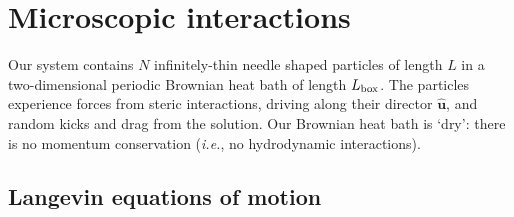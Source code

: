 \section{Microscopic interactions}
Our system contains $N$ infinitely-thin needle shaped particles of length $L$ in
a two-dimensional periodic Brownian heat bath of length $L_{\mathrm{box}}$. The
particles experience forces from steric interactions, driving along their
director $ \hat{\bm{u}} $, and random kicks and drag from the solution. Our
Brownian heat bath is `dry': there is no momentum conservation (\textit{i.e.},
no hydrodynamic interactions).

\subsection{Langevin equations of motion}

